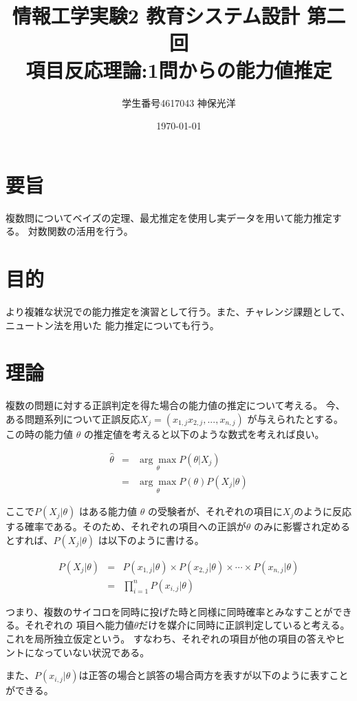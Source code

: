 \documentclass{jsarticle}
\title{情報工学実験2 教育システム設計 第二回\\
        項目反応理論:1問からの能力値推定}
\author{学生番号4617043 神保光洋}
\date{\today}
\begin{document}
\maketitle

\section{要旨}
複数問についてベイズの定理、最尤推定を使用し実データを用いて能力推定する。
対数関数の活用を行う。

\section{目的}
より複雑な状況での能力推定を演習として行う。また、チャレンジ課題として、ニュートン法を用いた
能力推定についても行う。

\section{理論}
複数の問題に対する正誤判定を得た場合の能力値の推定について考える。
今、ある問題系列について正誤反応$X_j = (x_{1,j} x_{2,j},...,x_{n,j})$ が与えられたとする。
この時の能力値 $\theta$ の推定値を考えると以下のような数式を考えれば良い。

\begin{eqnarray*}
  \hat{\theta} &=& \underset{\theta}{\arg \max} P(\theta | X_j) \\
               &=& \underset{\theta}{\arg \max} P(\theta)P(X_j | \theta)
\end{eqnarray*}

ここで$P(X_j | \theta)$ はある能力値 $\theta$ の受験者が、それぞれの項目に$X_j$のように反応
する確率である。そのため、それぞれの項目への正誤が$\theta$
のみに影響され定めるとすれば、$P(X_j| \theta)$ は以下のように書ける。


\begin{eqnarray*}
  P(X_j | \theta) &=& P(x_{1,j} | \theta) \times P(x_{2,j} | \theta) \times \cdots \times P(x_{n,j} | \theta) \\
                  &=& {\prod}^{n}_{i=1} P(x_{i,j}| \theta)
\end{eqnarray*}

つまり、複数のサイコロを同時に投げた時と同様に同時確率とみなすことができる。それぞれの
項目へ能力値$\theta$だけを媒介に同時に正誤判定していると考える。これを局所独立仮定という。
すなわち、それぞれの項目が他の項目の答えやヒントになっていない状況である。

また、$P(x_{i,j}| \theta)$は正答の場合と誤答の場合両方を表すが以下のように表すことができる。
\end{document}
